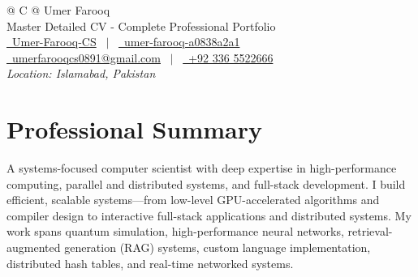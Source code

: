 \documentclass[a4paper,12pt]{article}
\begin{document}
\pagestyle{empty}

\begin{tabularx}{\linewidth}{@{} C @{}}
\Huge{Umer Farooq} \\[7.5pt]
\large{Master Detailed CV - Complete Professional Portfolio} \\[7.5pt]
\href{https://github.com/Umer-Farooq-CS}{\raisebox{-0.05\height}\faGithub\ Umer-Farooq-CS} \ $|$ \ 
\href{https://linkedin.com/in/umer-farooq-a0838a2a1}{\raisebox{-0.05\height}\faLinkedin\ umer-farooq-a0838a2a1} \
\\\href{mailto:umerfarooqcs0891@gmail.com}{\raisebox{-0.05\height}\faEnvelope \ umerfarooqcs0891@gmail.com} \ $|$ \ 
\href{tel:+923365522666}{\raisebox{-0.05\height}\faMobile \ +92 336 5522666} \\
\textit{Location: Islamabad, Pakistan}
\end{tabularx}

\section{Professional Summary}
A systems-focused computer scientist with deep expertise in high-performance computing, parallel and distributed systems, and full-stack development. I build efficient, scalable systems—from low-level GPU-accelerated algorithms and compiler design to interactive full-stack applications and distributed systems. My work spans quantum simulation, high-performance neural networks, retrieval-augmented generation (RAG) systems, custom language implementation, distributed hash tables, and real-time networked systems.
\end{document}
